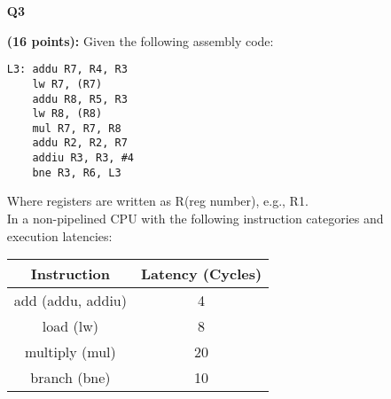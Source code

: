 \documentclass[a4paper,10pt]{article}
\begin{document}
\begin{enumerate}
{\begin{enumerate}
            \vspace{4cm}
         \end{enumerate}
    }
    \item[\textbf{Q3}]{\textbf{(16 points):}
        Given the following assembly code:
        \begin{verbatim}
L3:	addu R7, R4, R3  
    lw R7, (R7)    
    addu R8, R5, R3 
    lw R8, (R8) 
    mul R7, R7, R8 
    addu R2, R2, R7 
    addiu R3, R3, #4 
    bne R3, R6, L3
        \end{verbatim}
        Where registers are written as R(reg number), e.g., R1. \\
        
        In a non-pipelined CPU with the following instruction categories and execution latencies: \\ 
        
        \begin{table}[!hbpt]
            \centering
            \begin{tabular}{|c|c|}
                \hline
                \textbf{Instruction} & \textbf{Latency (Cycles)} \\ \hline
                add (addu, addiu)    & 4                         \\ \hline
                load (lw)            & 8                         \\ \hline
                multiply (mul)       & 20                        \\ \hline
                branch (bne)         & 10                        \\ \hline
            \end{tabular}
        \end{table}
        
}
\end{enumerate}
\end{document}
